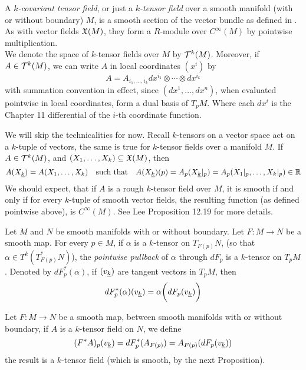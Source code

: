 \documentclass[../main-manifolds.tex]{subfiles}
\begin{document}
\begin{definition}
    A \emph{$k$-covariant tensor field}, or just a \emph{$k$-tensor field} over a smooth manifold (with or without boundary) $M$, is a smooth section of the vector bundle as defined in . As with vector fields $\mathfrak{X}(M)$, they form a $R$-module over $C^\infty(M)$ by pointwise multiplication.\\

    We denote the space of $k$-tensor fields over $M$ by $\mathcal{T}^k(M)$. Moreover, if $A\in \mathcal{T}^k(M)$, we can write $A$ in local coordinates $(x^i)$ by
    \[
        A = A_{i_1,\ldots,i_k}dx^{i_1}\otimes\cdots\otimes dx^{i_k}
    \]
    with summation convention in effect, since $(dx^{1},\ldots,dx^{n})$, when evaluated pointwise in local coordinates, form a dual basis of $T_pM$. Where each $dx^i$ is the Chapter 11 differential of the $i$-th coordinate function.
\end{definition}
We will skip the technicalities for now. Recall $k$-tensors on a vector space act on a $k$-tuple of vectors, the same is true for $k$-tensor fields over a manifold $M$. If $A\in \mathcal{T}^k(M)$, and $(X_1,\ldots, X_k)\subseteq\mathfrak{X}(M)$, then
\[
    A(\Ul{X}[k]) = A(X_1,\ldots,X_k)\quad\text{such that}\quad A(\Ul{X}[k])(p) = A_p(\Ul{X}[k]\vert_{p}) = A_p(X_1\vert_{p},\ldots,X_k\vert_{p})\in\real
\]
We should expect, that if $A$ is a rough $k$-tensor field over $M$, it is smooth if and only if for every $k$-tuple of smooth vector fields, the resulting function (as defined pointwise above), is $C^\infty(M)$. See Lee Proposition 12.19 for more details.


\begin{definition}
    Let $M$ and $N$ be smooth manifolds with or without boundary. Let $F:M\to N$ be a smooth map. For every $p\in M$, if $\alpha$ is a $k$-tensor on $T_{F(p)}N$, (so that $\alpha\in T^k(T_{F(p)}^*N)$), the \emph{pointwise pullback} of $\alpha$ through $dF_p$ is a $k$-tensor on $T_p M$. Denoted by $dF^*_p(\alpha)$, if $(\Ul{v}[k])$ are tangent vectors in $T_pM$, then
\[
    dF^*_p(\alpha)(\Ul{v}[k]) = \alpha\biggl(dF_p(\Ul{v}[k])\biggr)
\]
\end{definition}

\begin{definition}
    Let $F: M\to N$ be a smooth map, between smooth manifolds with or without boundary, if $A$ is a $k$-tensor field on $N$, we define 
    \[
        (F^*A)_p(\Ul{v}[k]) = dF^*_p(A_{F(p)}) = A_{F(p)}(dF_p(\Ul{v}[k]))
    \]
    the result is a $k$-tensor field (which is smooth, by the next Proposition).
\end{definition}
\end{document}
